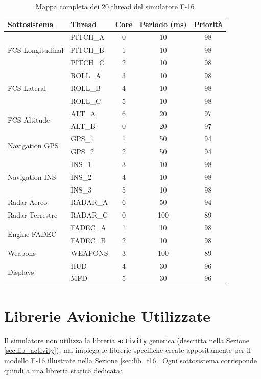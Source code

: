 \begin{table}[htbp]
	\centering
	\caption{Mappa completa dei 20 thread del simulatore F-16}
	\label{tab:f16_threads}
	\begin{tabular}{|l|l|c|c|c|}
		\hline
		\textbf{Sottosistema} & \textbf{Thread} & \textbf{Core} & \textbf{Periodo (ms)} & \textbf{Priorità} \\
		\hline
		\multirow{3}{*}{FCS Longitudinal} & PITCH\_A & 0 & 10 & 98 \\
		& PITCH\_B & 1 & 10 & 98 \\
		& PITCH\_C & 2 & 10 & 98 \\
		\hline
		\multirow{3}{*}{FCS Lateral} & ROLL\_A & 3 & 10 & 98 \\
		& ROLL\_B & 4 & 10 & 98 \\
		& ROLL\_C & 5 & 10 & 98 \\
		\hline
		\multirow{2}{*}{FCS Altitude} & ALT\_A & 6 & 20 & 97 \\
		& ALT\_B & 0 & 20 & 97 \\
		\hline
		\multirow{2}{*}{Navigation GPS} & GPS\_1 & 1 & 50 & 94 \\
		& GPS\_2 & 2 & 50 & 94 \\
		\hline
		\multirow{3}{*}{Navigation INS} & INS\_1 & 3 & 10 & 98 \\
		& INS\_2 & 4 & 10 & 98 \\
		& INS\_3 & 5 & 10 & 98 \\
		\hline
		Radar Aereo & RADAR\_A & 6 & 50 & 94 \\
		\hline
		Radar Terrestre & RADAR\_G & 0 & 100 & 89 \\
		\hline
		\multirow{2}{*}{Engine FADEC} & FADEC\_A & 1 & 10 & 98 \\
		& FADEC\_B & 2 & 10 & 98 \\
		\hline
		Weapons & WEAPONS & 3 & 100 & 89 \\
		\hline
		\multirow{2}{*}{Displays} & HUD & 4 & 30 & 96 \\
		& MFD & 5 & 30 & 96 \\
		\hline
	\end{tabular}
\end{table}

\clearpage
\section{Librerie Avioniche Utilizzate}
Il simulatore non utilizza la libreria \texttt{activity} generica (descritta nella Sezione \ref{sec:lib_activity}), ma impiega le librerie  specifiche create appositamente per il modello F-16 illustrate nella Sezione \ref{sec:lib_f16}. Ogni sottosistema  corrisponde quindi a una libreria statica dedicata:

